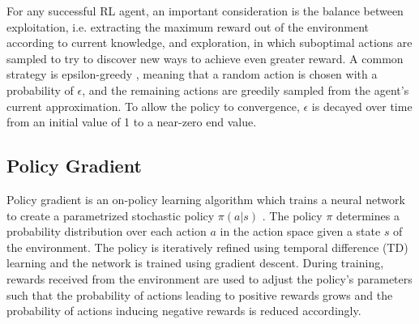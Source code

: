 \documentclass[10pt,journal,compsoc]{IEEEtran}
\begin{document}
For any successful RL agent, an important consideration is the balance between exploitation, i.e. extracting the maximum reward out of the environment according to current knowledge, and exploration, in which suboptimal actions are sampled to try to discover new ways to achieve even greater reward. A common strategy is epsilon-greedy \cite{sutton1998reinforcement}, meaning that a random action is chosen with a probability of $\epsilon$, and the remaining actions are greedily sampled from the agent's current approximation. To allow the policy to convergence, $\epsilon$ is decayed over time from an initial value of 1 to a near-zero end value.
\subsection{Policy Gradient}
Policy gradient is an on-policy learning algorithm which trains a neural network to create a parametrized stochastic policy $\pi(a|s)$ \cite{sutton1999policy}.
The policy $\pi$ determines a probability distribution over each action $a$ in the action space given a state $s$ of the environment.
The policy is iteratively refined using temporal difference (TD) learning \cite{sutton1988learning} and the network is trained using gradient descent.
During training, rewards received from the environment are used to adjust the policy's parameters such that the probability of actions leading to positive rewards grows and the probability of actions inducing negative rewards is reduced accordingly.
\end{document}
